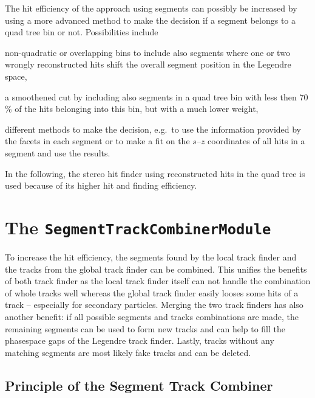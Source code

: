 The hit efficiency of the approach using segments can possibly be increased by using a more advanced method to make the decision if a segment belongs to a quad tree bin or not. Possibilities include 
\begin{zlist}
 \item non-quadratic or overlapping bins to include also segments where one or two wrongly reconstructed hits shift the overall segment position in the Legendre space,
 \item a smoothened cut by including also segments in a quad tree bin with less then 70 \% of the hits belonging into this bin, but with a much lower weight,
 \item different methods to make the decision, e.g.\ to use the information provided by the facets in each segment or to make a fit on the $s$--$z$ coordinates of all hits in a segment and use the results.
\end{zlist}

In the following, the stereo hit finder using reconstructed hits in the quad tree is used because of its higher hit and finding efficiency.

\section{The \texttt{SegmentTrackCombinerModule}} \label{section-combiner}

To increase the hit efficiency, the segments found by the local track finder and the tracks from the global track finder can be combined. This unifies the benefits of both track finder as the local track finder itself can not handle the combination of whole tracks well whereas the global track finder easily looses some hits of a track -- especially for secondary particles. Merging the two track finders has also another benefit: if all possible segments and tracks combinations are made, the remaining segments can be used to form new tracks and can help to fill the phasespace gaps of the Legendre track finder. Lastly, tracks without any matching segments are most likely fake tracks and can be deleted.

\subsection{Principle of the Segment Track Combiner}

